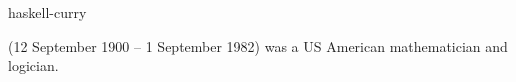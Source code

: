 \documentclass{stex}
\begin{document}
\begin{smodule}{haskell-curry}
\begin{sparagraph}[style=symdoc]
   (12 September 1900 – 1 September 1982) was a US American mathematician and logician.
\end{sparagraph}
\end{smodule}
\end{document}
